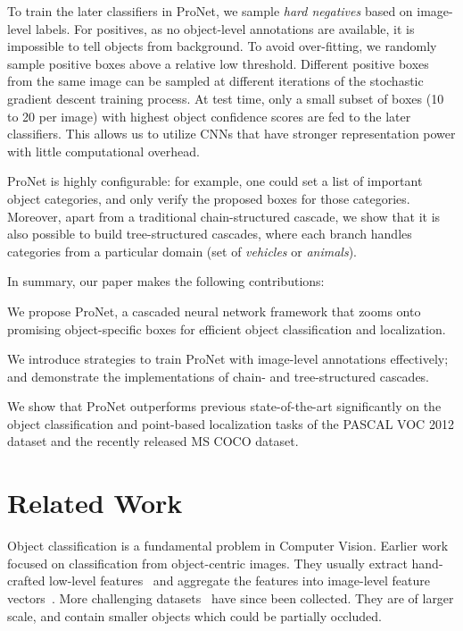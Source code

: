 \documentclass[10pt,twocolumn,letterpaper]{article}
\begin{document}
To train the later classifiers in ProNet, we sample \textit{hard negatives} based on image-level labels. For positives, as no object-level annotations are available, it is impossible to tell objects from background. To avoid over-fitting, we randomly sample positive boxes above a relative low threshold. Different positive boxes from the same image can be sampled at different iterations of the stochastic gradient descent training process. At test time, only a small subset of boxes (10 to 20 per image) with highest object confidence scores are fed to the later classifiers. This allows us to utilize CNNs that have stronger representation power with little computational overhead.

ProNet is highly configurable: for example, one could set a list of important object categories, and only verify the proposed boxes for those categories. Moreover, apart from a traditional chain-structured cascade, we show that it is also possible to build tree-structured cascades, where each branch handles categories from a particular domain (\eg set of \textit{vehicles} or \textit{animals}). 

In summary, our paper makes the following contributions:
\begin{compactitem}
\item We propose ProNet, a cascaded neural network framework that zooms onto promising object-specific boxes for efficient object classification and localization.
\item We introduce strategies to train ProNet with image-level annotations effectively; and demonstrate the implementations of chain- and tree-structured cascades.
\item We show that ProNet outperforms previous state-of-the-art significantly on the object classification and point-based localization tasks of the PASCAL VOC 2012 dataset and the recently released MS COCO dataset.
\end{compactitem}

\section{Related Work}
Object classification is a fundamental problem in Computer Vision. Earlier work~\cite{DBLP:conf/iccv/GraumanD05,DBLP:journals/cviu/Fei-FeiFP07,DBLP:journals/ijcv/SanchezPMV13} focused on classification from object-centric images. They usually extract hand-crafted low-level features~\cite{DBLP:journals/ijcv/Lowe04} and aggregate the features into image-level feature vectors~\cite{Perronnin07FV,DBLP:conf/cvpr/WangYYLHG10}. More challenging datasets~\cite{Everingham10,DBLP:journals/corr/LinMBHPRDZ14,ILSVRCarxiv14} have since been collected. They are of larger scale, and contain smaller objects which could be partially occluded.
\end{document}
